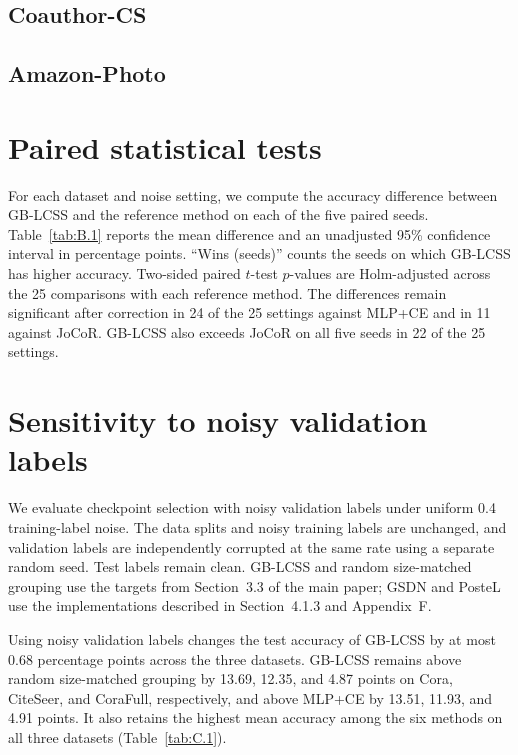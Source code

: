 \documentclass[times,10pt]{elsarticle}
\begin{document}



\subsection{Coauthor-CS}\label{sec:A.4}




\subsection{Amazon-Photo}\label{sec:A.5}


\setcounter{table}{0}

\section{Paired statistical tests}\label{sec:B}

For each dataset and noise setting, we compute the accuracy difference between GB-LCSS and the reference method on each of the five paired seeds. Table~\ref{tab:B.1} reports the mean difference and an unadjusted 95\% confidence interval in percentage points. ``Wins (seeds)'' counts the seeds on which GB-LCSS has higher accuracy. Two-sided paired \(t\)-test \(p\)-values are Holm-adjusted across the 25 comparisons with each reference method. The differences remain significant after correction in 24 of the 25 settings against MLP+CE and in 11 against JoCoR. GB-LCSS also exceeds JoCoR on all five seeds in 22 of the 25 settings.


\setcounter{table}{0}

\section{Sensitivity to noisy validation labels}\label{sec:C}

We evaluate checkpoint selection with noisy validation labels under uniform 0.4 training-label noise. The data splits and noisy training labels are unchanged, and validation labels are independently corrupted at the same rate using a separate random seed. Test labels remain clean. GB-LCSS and random size-matched grouping use the targets from Section~3.3 of the main paper; GSDN and PosteL use the implementations described in Section~4.1.3 and Appendix~F.



Using noisy validation labels changes the test accuracy of GB-LCSS by at most 0.68 percentage points across the three datasets. GB-LCSS remains above random size-matched grouping by 13.69, 12.35, and 4.87 points on Cora, CiteSeer, and CoraFull, respectively, and above MLP+CE by 13.51, 11.93, and 4.91 points. It also retains the highest mean accuracy among the six methods on all three datasets (Table~\ref{tab:C.1}).
\setcounter{table}{0}
\end{document}
